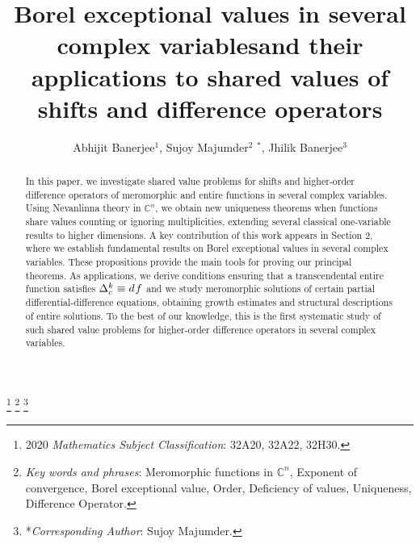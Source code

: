 \documentclass[11pt,reqno]{amsart}
\numberwithin{equation}{section}
\begin{document}
\title[B\MakeLowercase{orel Exceptional Values in Several Complex Variables}......]{\LARGE B\Large\MakeLowercase{orel Exceptional Values in Several Complex Variables\newline and Their Applications to Shared Values of Shifts\newline \vspace {.25cc} and Difference Operators}}

\date{}
\author[A. B\MakeLowercase{anerjee}, S. M\MakeLowercase{ajumder}, J. B\MakeLowercase{anerjee}]{A\MakeLowercase{bhijit} B\MakeLowercase{anerjee}$^1$, S\MakeLowercase{ujoy} M\MakeLowercase{ajumder}$^2$ $^{*}$, J\MakeLowercase{hilik} B\MakeLowercase{anerjee}$^3$}
\address{$^{1}$ Department of Mathematics, University of Kalyani, West Bengal 741235, India.}
\address{$^{2}$Department of Mathematics, Raiganj University, Raiganj, West Bengal-733134, India.}
	\address{$^{3}$ Department of Mathematics, University of Kalyani, West Bengal 741235, India.}


\renewcommand{\thefootnote}{}
\footnote{2020 \emph{Mathematics Subject Classification}: 32A20, 32A22, 32H30.}
\footnote{\emph{Key words and phrases}: Meromorphic functions in $\mathbb{C}^n$, Exponent of convergence, Borel exceptional value, Order, Deficiency of values, Uniqueness, Difference Operator.}
\footnote{*\emph{Corresponding Author}: Sujoy Majumder.}

\renewcommand{\thefootnote}{\arabic{footnote}}
\setcounter{footnote}{0}

\begin{abstract} 
In this paper, we investigate shared value problems for shifts and higher-order difference operators of meromorphic and entire functions in several complex variables. Using Nevanlinna theory in $\mathbb{C}^n$, we obtain new uniqueness theorems when functions share values counting or ignoring multiplicities, extending several classical one-variable results to higher dimensions. A key contribution of this work appears in Section 2, where we establish fundamental results on Borel exceptional values in several complex variables. These propositions provide the main tools for proving our principal theorems. As applications, we derive conditions ensuring that a transcendental entire function satisfies $\Delta_c^{k} \equiv d\hspace{.05cc} f$ and we study meromorphic solutions of certain partial differential-difference equations, obtaining growth estimates and structural descriptions of entire solutions. To the best of our knowledge, this is the first systematic study of such shared value problems for higher-order difference operators in several complex variables.
\end{abstract}
\end{document}
